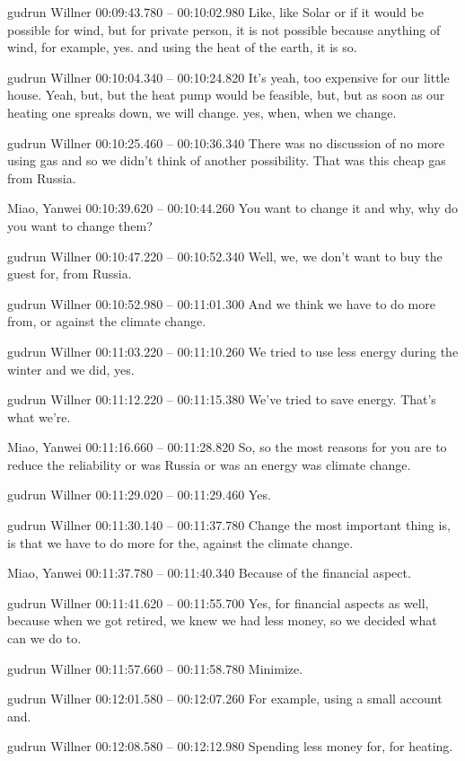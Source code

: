 {gudrun Willner 00:09:43.780 -- 00:10:02.980
Like, like Solar or if it would be possible for wind, but for private person, it is not possible because anything of wind, for example, yes. and using the heat of the earth, it is so.

gudrun Willner 00:10:04.340 -- 00:10:24.820
It's yeah, too expensive for our little house. Yeah, but, but the heat pump would be feasible, but, but as soon as our heating one spreaks down, we will change. yes, when, when we change.

gudrun Willner 00:10:25.460 -- 00:10:36.340
There was no discussion of no more using gas and so we didn't think of another possibility. That was this cheap gas from Russia.

Miao, Yanwei 00:10:39.620 -- 00:10:44.260
You want to change it and why, why do you want to change them?

gudrun Willner 00:10:47.220 -- 00:10:52.340
Well, we, we don't want to buy the guest for, from Russia.

gudrun Willner 00:10:52.980 -- 00:11:01.300
And we think we have to do more from, or against the climate change.

gudrun Willner 00:11:03.220 -- 00:11:10.260
We tried to use less energy during the winter and we did, yes.

gudrun Willner 00:11:12.220 -- 00:11:15.380
We've tried to save energy. That's what we're.

Miao, Yanwei 00:11:16.660 -- 00:11:28.820
So, so the most reasons for you are to reduce the reliability or was Russia or was an energy was climate change.

gudrun Willner 00:11:29.020 -- 00:11:29.460
Yes.

gudrun Willner 00:11:30.140 -- 00:11:37.780
Change the most important thing is, is that we have to do more for the, against the climate change.

Miao, Yanwei 00:11:37.780 -- 00:11:40.340
Because of the financial aspect.

gudrun Willner 00:11:41.620 -- 00:11:55.700
Yes, for financial aspects as well, because when we got retired, we knew we had less money, so we decided what can we do to.

gudrun Willner 00:11:57.660 -- 00:11:58.780
Minimize.

gudrun Willner 00:12:01.580 -- 00:12:07.260
For example, using a small account and.

gudrun Willner 00:12:08.580 -- 00:12:12.980
Spending less money for, for heating.

}
